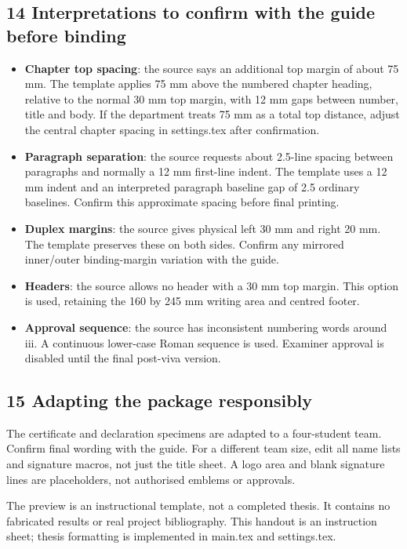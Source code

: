 \documentclass[11pt,a4paper]{article}
\newcommand{\Key}[1]{\textbf{#1}}
\begin{document}
\subsection*{14 Interpretations to confirm with the guide before binding}
\begin{itemize}
\item \Key{Chapter top spacing}: the source says an additional top margin of
about 75 mm. The template applies 75 mm above the numbered chapter heading,
relative to the normal 30 mm top margin, with 12 mm gaps between number, title
and body. If the department treats 75 mm as a total top distance, adjust the
central chapter spacing in settings.tex after confirmation.
\item \Key{Paragraph separation}: the source requests about 2.5-line spacing
between paragraphs and normally a 12 mm first-line indent. The template uses a
12 mm indent and an interpreted paragraph baseline gap of 2.5 ordinary baselines.
Confirm this approximate spacing before final printing.
\item \Key{Duplex margins}: the source gives physical left 30 mm and right
20 mm. The template preserves these on both sides. Confirm any mirrored
inner/outer binding-margin variation with the guide.
\item \Key{Headers}: the source allows no header with a 30 mm top margin. This
option is used, retaining the 160 by 245 mm writing area and centred footer.
\item \Key{Approval sequence}: the source has inconsistent numbering words
around iii. A continuous lower-case Roman sequence is used. Examiner approval
is disabled until the final post-viva version.
\end{itemize}

\subsection*{15 Adapting the package responsibly}
The certificate and declaration specimens are adapted to a four-student team.
Confirm final wording with the guide. For a different team size, edit all name
lists and signature macros, not just the title sheet. A logo area and blank
signature lines are placeholders, not authorised emblems or approvals.

The preview is an instructional template, not a completed thesis. It contains no
fabricated results or real project bibliography. This handout is an instruction
sheet; thesis formatting is implemented in main.tex and settings.tex.
\end{document}

